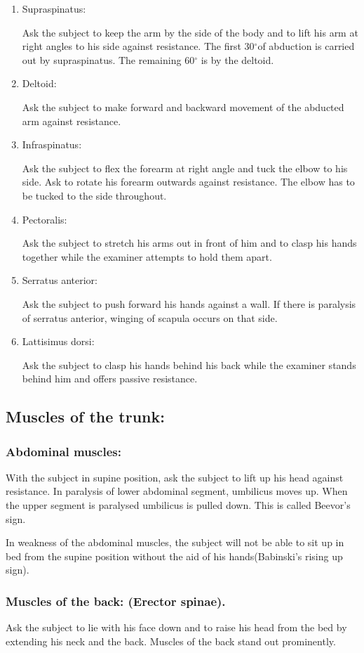 \documentclass[a4paper,12pt,openany,oneside]{book}
\begin{document}
\begin{enumerate}
{The subject is asked to extend the flexed forearm against resistance.
}
\item{ Supraspinatus: 
\par
Ask the subject to keep the arm by the side of the body and to lift his arm at right angles to his side against resistance. The first 30$^\circ$of abduction is carried out by supraspinatus. The remaining 60$^\circ$ is by the deltoid.
}
\item{ Deltoid: 
\par
Ask the subject to make forward and backward movement of the abducted arm against resistance.
}
\item{ Infraspinatus: 
\par
Ask the subject to flex the forearm at right angle and tuck the elbow to his side. Ask to rotate his forearm outwards against resistance. The elbow has to be tucked to the side throughout.
}
\item{ Pectoralis: 
\par
Ask the subject to stretch his arms out in front of him and to clasp his hands together while the examiner attempts to hold them apart.
}
\item{ Serratus anterior: 
\par
Ask the subject to push forward his hands against a wall. If there is paralysis of serratus anterior, winging of scapula occurs on that side.
}
\item{ Lattisimus dorsi: 
\par
Ask the subject to clasp his hands behind his back while the examiner stands behind him and offers passive resistance.
}	
\end{enumerate}
\subsection*{Muscles	of	the	trunk:}	
\subsubsection*{Abdominal muscles:}
	With the subject in supine position, ask the subject to lift up his head against resistance. In paralysis of lower abdominal segment, umbilicus moves up. When the upper segment is paralysed umbilicus is pulled down. This is called Beevor's sign.
	\par
	In weakness of the abdominal muscles, the subject will not be able to sit up in bed from the supine position without the aid of his hands(Babinski’s rising up sign).
	\subsubsection*{Muscles of the back: (Erector spinae).}
	Ask the subject to lie with his face down and to raise his head from the bed by extending his neck and the back. Muscles of the back stand out prominently.
\end{document}
